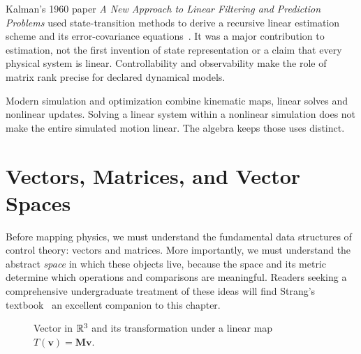 Kalman's 1960 paper \emph{A New Approach to Linear Filtering and Prediction Problems} used state-transition methods to derive a recursive linear estimation scheme and its error-covariance equations~\cite{Kalman1960}. It was a major contribution to estimation, not the first invention of state representation or a claim that every physical system is linear. Controllability and observability make the role of matrix rank precise for declared dynamical models.

Modern simulation and optimization combine kinematic maps, linear solves and nonlinear updates. Solving a linear system within a nonlinear simulation does not make the entire simulated motion linear. The algebra keeps those uses distinct.

\section{Vectors, Matrices, and Vector Spaces}
\label{sec:vectors_matrices}

Before mapping physics, we must understand the fundamental data structures of control theory: vectors and matrices. More importantly, we must understand the abstract \emph{space} in which these objects live, because the space and its metric determine which operations and comparisons are meaningful. Readers seeking a comprehensive undergraduate treatment of these ideas will find Strang's textbook~\cite{strang2019} an excellent companion to this chapter.

\begin{figure}[htb]
\centering
{}
\caption{Vector in $\mathbb{R}^3$ and its transformation under a linear map $T(\mathbf{v}) = \mathbf{M}\mathbf{v}$.}
\label{fig:vector_transformation}
\end{figure}

